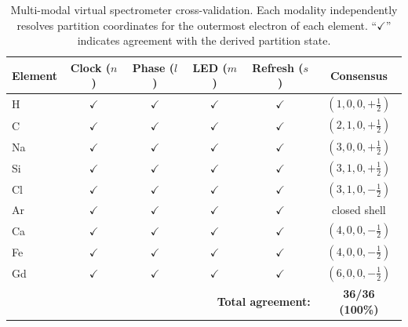 \documentclass[11pt,twocolumn,a4paper]{article}
\theoremstyle{definition}
\theoremstyle{remark}
\begin{document}
\begin{table}[H]
\centering
\caption{Multi-modal virtual spectrometer cross-validation. Each modality independently resolves partition coordinates for the outermost electron of each element. ``$\checkmark$'' indicates agreement with the derived partition state.}
\label{tab:cross_validation}
\small
\begin{tabular}{lccccc}
\toprule
\textbf{Element} & \textbf{Clock ($n$)} & \textbf{Phase ($l$)} & \textbf{LED ($m$)} & \textbf{Refresh ($s$)} & \textbf{Consensus} \\
\midrule
H  & $\checkmark$ & $\checkmark$ & $\checkmark$ & $\checkmark$ & $(1,0,0,+\frac{1}{2})$ \\
C  & $\checkmark$ & $\checkmark$ & $\checkmark$ & $\checkmark$ & $(2,1,0,+\frac{1}{2})$ \\
Na & $\checkmark$ & $\checkmark$ & $\checkmark$ & $\checkmark$ & $(3,0,0,+\frac{1}{2})$ \\
Si & $\checkmark$ & $\checkmark$ & $\checkmark$ & $\checkmark$ & $(3,1,0,+\frac{1}{2})$ \\
Cl & $\checkmark$ & $\checkmark$ & $\checkmark$ & $\checkmark$ & $(3,1,0,-\frac{1}{2})$ \\
Ar & $\checkmark$ & $\checkmark$ & $\checkmark$ & $\checkmark$ & closed shell \\
Ca & $\checkmark$ & $\checkmark$ & $\checkmark$ & $\checkmark$ & $(4,0,0,-\frac{1}{2})$ \\
Fe & $\checkmark$ & $\checkmark$ & $\checkmark$ & $\checkmark$ & $(4,0,0,-\frac{1}{2})$ \\
Gd & $\checkmark$ & $\checkmark$ & $\checkmark$ & $\checkmark$ & $(6,0,0,-\frac{1}{2})$ \\
\midrule
\multicolumn{5}{r}{\textbf{Total agreement:}} & \textbf{36/36 (100\%)} \\
\bottomrule
\end{tabular}
\end{table}
\end{document}
